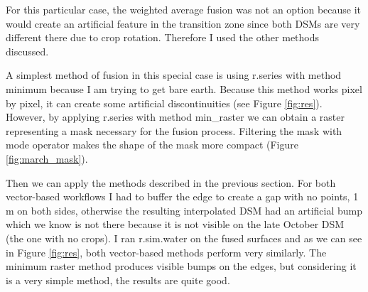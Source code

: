 \documentclass[a4paper,10pt]{article}
\begin{document}
For this particular case, the weighted average fusion was not an option
because it would create an artificial feature in the transition zone
since both DSMs are very different there due to crop rotation.
Therefore I used the other methods discussed.

A simplest method of fusion in this special case is using r.series with method minimum
because I am trying to get bare earth. Because this method works pixel by pixel,
it can create some artificial discontinuities (see Figure \ref{fig:res}).
However, by applying r.series
with method min\_raster
we can obtain a raster representing a mask necessary for the fusion process.
Filtering the mask with mode operator
makes the shape of the mask more compact (Figure \ref{fig:march_mask}).

Then we can apply the methods described in the previous section.
For both vector-based workflows I had to buffer the edge to create a gap with no points,
1 m on both sides, otherwise the resulting interpolated DSM had an artificial bump
which we know is not there because it is not visible
on the late October DSM (the one with no crops).
I ran r.sim.water on the fused surfaces and as we can see in Figure
\ref{fig:res}, both vector-based methods perform very similarly. The minimum 
raster method produces visible bumps on the edges, but considering
it is a very simple method, the results are quite good.
\end{document}
